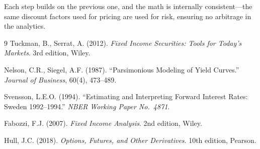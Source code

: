 \documentclass[11pt]{article}
\begin{document}
Each step builds on the previous one, and the math is internally consistent---the same discount factors used for pricing are used for risk, ensuring no arbitrage in the analytics.

\begin{thebibliography}{9}
 Tuckman, B., Serrat, A. (2012). \textit{Fixed Income Securities: Tools for Today's Markets}. 3rd edition, Wiley.

 Nelson, C.R., Siegel, A.F. (1987). ``Parsimonious Modeling of Yield Curves.'' \textit{Journal of Business}, 60(4), 473--489.

 Svensson, L.E.O. (1994). ``Estimating and Interpreting Forward Interest Rates: Sweden 1992--1994.'' \textit{NBER Working Paper No.\ 4871}.

 Fabozzi, F.J. (2007). \textit{Fixed Income Analysis}. 2nd edition, Wiley.

 Hull, J.C. (2018). \textit{Options, Futures, and Other Derivatives}. 10th edition, Pearson.
\end{thebibliography}
\end{document}
